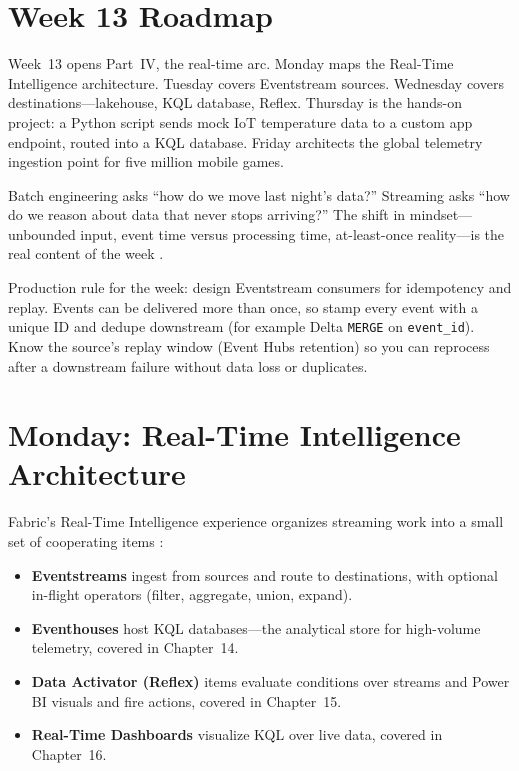 \section{Week 13 Roadmap}
Week~13 opens Part~IV, the real-time arc. Monday maps the Real-Time Intelligence architecture. Tuesday covers Eventstream sources. Wednesday covers destinations---lakehouse, KQL database, Reflex. Thursday is the hands-on project: a Python script sends mock IoT temperature data to a custom app endpoint, routed into a KQL database. Friday architects the global telemetry ingestion point for five million mobile games.

Batch engineering asks ``how do we move last night's data?'' Streaming asks ``how do we reason about data that never stops arriving?'' The shift in mindset---unbounded input, event time versus processing time, at-least-once reality---is the real content of the week \cite{microsoftFabricEventstreams}.

\begin{notebox}
Production rule for the week: design Eventstream consumers for idempotency and replay. Events can be delivered more than once, so stamp every event with a unique ID and dedupe downstream (for example Delta \texttt{MERGE} on \texttt{event\_id}). Know the source's replay window (Event Hubs retention) so you can reprocess after a downstream failure without data loss or duplicates.
\end{notebox}

\section{Monday: Real-Time Intelligence Architecture}
Fabric's Real-Time Intelligence experience organizes streaming work into a small set of cooperating items \cite{microsoftFabricEventstreams,microsoftFabricEventhouse}:

\begin{itemize}
    \item \textbf{Eventstreams} ingest from sources and route to destinations, with optional in-flight operators (filter, aggregate, union, expand).
    \item \textbf{Eventhouses} host KQL databases---the analytical store for high-volume telemetry, covered in Chapter~14.
    \item \textbf{Data Activator (Reflex)} items evaluate conditions over streams and Power BI visuals and fire actions, covered in Chapter~15.
    \item \textbf{Real-Time Dashboards} visualize KQL over live data, covered in Chapter~16.
\end{itemize}

